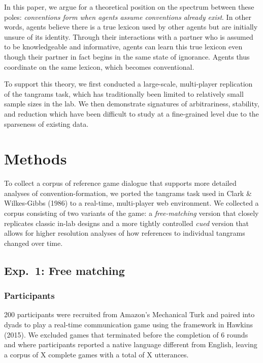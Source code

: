 \documentclass[manuscript]{stjour}
\begin{document}
In this paper, we argue for a theoretical position on the spectrum
between these poles: \emph{conventions form when agents assume
conventions already exist}. In other words, agents believe there is a
true lexicon used by other agents but are initially unsure of its
identity. Through their interactions with a partner who is assumed to be
knowledgeable and informative, agents can learn this true lexicon even
though their partner in fact begins in the same state of ignorance.
Agents thus coordinate on the same lexicon, which becomes conventional.

To support this theory, we first conducted a large-scale, multi-player
replication of the tangrams task, which has traditionally been limited
to relatively small sample sizes in the lab. We then demonstrate signatures
of arbitrariness, stability, and reduction which have been difficult to
study at a fine-grained level due to the sparseness of existing data.

\section{Methods}

To collect a corpus of reference game dialogue that supports more
detailed analyses of convention-formation, we ported the tangrams task
used in Clark \& Wilkes-Gibbs (1986) to a real-time, multi-player web
environment. 
We collected a corpus consisting of two variants of the game: a \emph{free-matching} version that closely replicates classic in-lab designs and a more tightly controlled \emph{cued} version that allows for higher resolution analyses of how references to individual tangrams changed over time. 

\subsection{Exp.~1: Free matching}

\subsubsection{Participants}\label{participants}

200 participants were recruited from Amazon's Mechanical Turk and paired
into dyads to play a real-time communication game using the framework in
Hawkins (2015). We excluded games that terminated before the completion
of 6 rounds and where participants reported a native language different
from English, leaving a corpus of X complete games with a total of
X utterances.
\end{document}
